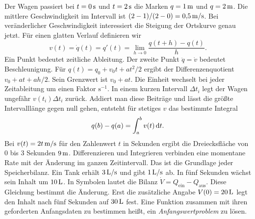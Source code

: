 Der Wagen passiert bei \(t=0\,\mathrm{s}\) und \(t=2\,\mathrm{s}\) die Marken \(q=1\,\mathrm{m}\) und \(q=2\,\mathrm{m}\). Die mittlere Geschwindigkeit im Intervall ist \( (2-1)/(2-0)=0{,}5\,\mathrm{m/s}\). Bei veränderlicher Geschwindigkeit interessiert die Steigung der Ortskurve genau jetzt. Für einen glatten Verlauf definieren wir
\[
 v(t)=\dot q(t)=q'(t)=\lim_{h\to0}\frac{q(t+h)-q(t)}{h}.
\]
Ein Punkt bedeutet zeitliche Ableitung. Der zweite Punkt \(\ddot q=\dot v\) bedeutet Beschleunigung. Für \(q(t)=q_0+v_0t+at^2/2\) ergibt der Differenzenquotient \(v_0+at+ah/2\). Sein Grenzwert ist \(v_0+at\). Die Einheit wechselt bei jeder Zeitableitung um einen Faktor \(\mathrm{s}^{-1}\).
In einem kurzen Intervall \(\Delta t_i\) legt der Wagen ungefähr \(v(t_i)\Delta t_i\) zurück. Addiert man diese Beiträge und lässt die größte Intervalllänge gegen null gehen, entsteht für stetiges \(v\) das bestimmte Integral
\[
 q(b)-q(a)=\int_a^b v(t)\,\mathrm{d} t.
\]
Bei \(v(t)=2t\,\mathrm{m/s}\) für den Zahlenwert \(t\) in Sekunden ergibt die Dreiecksfläche von 0 bis 3 Sekunden \(9\,\mathrm{m}\). Differenzieren und Integrieren verbinden eine momentane Rate mit der Änderung im ganzen Zeitintervall. Das ist die Grundlage jeder Speicherbilanz.
Ein Tank erhält \(3\,\mathrm{L/s}\) und gibt \(1\,\mathrm{L/s}\) ab. In fünf Sekunden wächst sein Inhalt um \(10\,\mathrm{L}\). In Symbolen lautet die Bilanz \(\dot V=Q_\mathrm{ein}-Q_\mathrm{aus}\). Diese Gleichung bestimmt die Änderung. Erst die zusätzliche Angabe \(V(0)=20\,\mathrm{L}\) legt den Inhalt nach fünf Sekunden auf \(30\,\mathrm{L}\) fest. Eine Funktion zusammen mit ihren geforderten Anfangsdaten zu bestimmen heißt, ein \emph{Anfangswertproblem} zu lösen.

